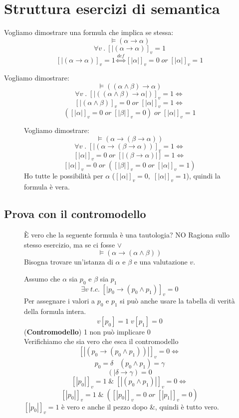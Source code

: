 \documentclass{article}
\theoremstyle{break}
\theoremstyle{break}
\theoremstyle{break}
\theoremstyle{break}
\begin{document}
\section{Struttura esercizi di semantica}
\begin{exercise}
	Vogliamo dimostrare una formula che implica se stessa:
	\[
		\models (\alpha \to \alpha)
	\]
	\[ \forall v\: . \: [|(\alpha \to \alpha)]_v = 1 \]
	\[
		[|(\alpha \to \alpha)]_v = 1 \stackrel{def}{\Leftrightarrow} [|\alpha|]_v=0\; or\; [|\alpha|]_v=1
	\]
\end{exercise}

\begin{exercise}
	Vogliamo dimostrare:
	\[
		\models ((\alpha \wedge \beta) \to \alpha)
	\]
	\[ \forall v\;.\; [|((\alpha \wedge \beta)\to \alpha|)]_v=1 \Leftrightarrow\]
	\[[|(\alpha \wedge \beta)]_v = 0\; or\; [|\alpha|]_v=1 \Leftrightarrow\]
	\[([|\alpha|]_v=0 \; or\; [|\beta|]_v=0)\;or\; [|\alpha|]_v=1\]
\end{exercise}
\begin{figure}[H]
	\begin{exercise}
		Vogliamo dimostrare:
		\[
			\models (\alpha \to (\beta \to \alpha))
		\]
		\[ \forall v\;.\; [|(\alpha \to (\beta \to \alpha))]_v = 1 \Leftrightarrow \]
		\[ [|\alpha|]_v=0 \; or \; [|(\beta \to \alpha)|] = 1 \Leftrightarrow \]
		\[ [|\alpha|]_v = 0 \; or \; ([|\beta|]_v = 0 \; or \; [|\alpha|]_v = 1) \]
		Ho tutte le possibilità per \( \alpha \) (\( [|\alpha|]_v=0,\; [|\alpha|]_v=1\)),
		quindi la formula è vera.
	\end{exercise}
\end{figure}

\subsection{Prova con il contromodello}
\begin{figure}[H]
	\begin{exercise}
		È vero che la seguente formula è una tautologia? NO
		Ragiona sullo stesso esercizio, ma se ci fosse \( \vee \)
		\[
			\models (\alpha \to (\alpha \wedge \beta))
		\]
		Bisogna trovare un'istanza di \( \alpha \) e \( \beta \) e una valutazione \( v \).

		Assumo che \( \alpha \) sia \( p_0 \) e \( \beta \) sia \( p_1 \)
		\[ \exists v\; t.c.\; [|p_0 \to (p_0 \wedge p_1)]_v=0 \]
		Per assegnare i valori a \( p_0 \) e \( p_1 \) si può anche usare
		la tabella di verità della formula intera.
		\[v[p_0]=1\; v[p_1]=0 \] (\textbf{Contromodello}) 1 non può implicare 0\\
		Verifichiamo che sia vero che esca il contromodello
		\[
			[|(p_0 \to (p_0 \wedge p_1))|]_v=0 \Leftrightarrow
		\]\[
			p_0=\delta\; \; \; (p_0 \wedge p_1) = \gamma
		\] \[
			(|\delta \to  \gamma) = 0
		\] \[
			[|p_0|]_v=1 \;\&\; [|(p_0 \wedge p_1)|]_v=0 \Leftrightarrow
		\] \[
			[|p_0|]_v=1 \;\&\; ([|p_0|]_v=0 \; or \; [|p_1|]_v=0)
		\]
		\( [|p_0|]_v=1 \) è vero e anche il pezzo dopo \&, quindi è tutto vero.

	\end{exercise}
\end{figure}
\end{document}
